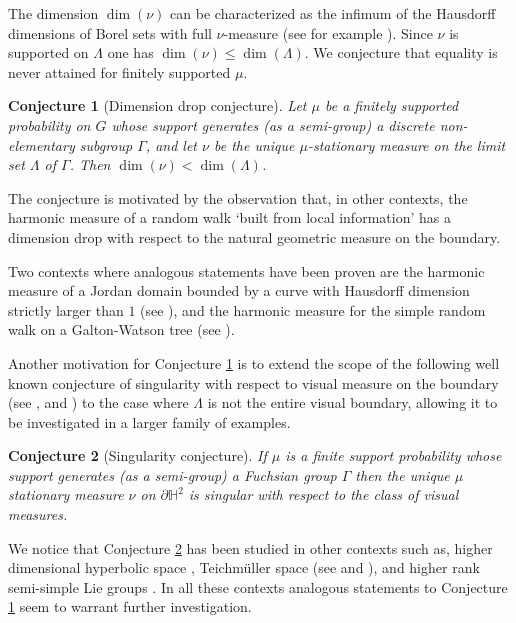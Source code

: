 \documentclass{article}
\newtheorem{conjecture}{Conjecture}
\renewcommand{\H}{\mathbb{H}}
\begin{document}
The dimension \(\dim(\nu)\) can be characterized as the infimum of the Hausdorff dimensions of Borel sets with full \(\nu\)-measure (see for example \cite[Proposition 2.1]{young}).  Since \(\nu\) is supported on \(\Lambda\) one has \(\dim(\nu) \le \dim(\Lambda)\).  We conjecture that equality is never attained for finitely supported \(\mu\).

\begin{conjecture}[Dimension drop conjecture]\label{mainconjecture}
Let \(\mu\) be a finitely supported probability on \(G\) whose support generates (as a semi-group) a discrete non-elementary subgroup \(\Gamma\), and let \(\nu\) be the unique \(\mu\)-stationary measure on the limit set \(\Lambda\) of \(\Gamma\).   Then \(\dim(\nu) < \dim(\Lambda)\).
\end{conjecture}

The conjecture is motivated by the observation that, in other contexts, the harmonic measure of a random walk `built from local information' has a dimension drop with respect to the natural geometric measure on the boundary.

Two contexts where analogous statements have been proven are the harmonic measure of a Jordan domain bounded by a curve with Hausdorff dimension strictly larger than \(1\) (see \cite{makarov}), and the harmonic measure for the simple random walk on a Galton-Watson tree (see \cite{lyons-pemantle-peres}).

Another motivation for Conjecture \ref{mainconjecture} is to extend the scope of the following well known conjecture of singularity with respect to visual measure on the boundary (see \cite[Conjecture 1.21]{dkn2009}, and \cite{kl2011}) to the case where \(\Lambda\) is not the entire visual boundary, allowing it to be investigated in a larger family of examples.

\begin{conjecture}[Singularity conjecture]\label{klconjecture}
If \(\mu\) is a finite support probability whose support generates (as a semi-group) a Fuchsian group \(\Gamma\) then the unique \(\mu\) stationary measure \(\nu\) on \(\partial \H^2\) is singular with respect to the class of visual measures.
\end{conjecture}

We notice that Conjecture \ref{klconjecture} has been studied in other contexts such as, higher dimensional hyperbolic space \cite{randecker-tiozzo}, Teichmüller space (see \cite{gadre} and \cite{gadre-maher-tiozzo-teich}), and higher rank semi-simple Lie groups \cite{kl2011}.  In all these contexts analogous statements to Conjecture \ref{mainconjecture} seem to warrant further investigation.
\end{document}
